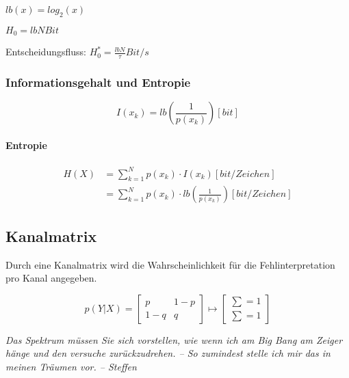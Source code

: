 \begin{multicols}{2}
	$lb(x) = log_2(x)$
	
	$H_0 = lbN Bit$
	
	Entscheidungsfluss: $H_0^* = \frac{lbN}{\tau} Bit/s$
	
	
	\subsubsection{Informationsgehalt und Entropie}
	
	\[
		I(x_k) = lb \left(\frac{1}{p(x_k)}\right) [bit]
	\]
	
	\paragraph{Entropie}
	
	\begin{align*}
		H(X) &= \sum_{k=1}^{N}{p(x_k) \cdot I(x_k)} [bit/Zeichen] \\
		&= \sum_{k=1}^{N}{p(x_k) \cdot lb \left(\frac{1}{p(x_k)}\right)} [bit/Zeichen]
	\end{align*}

	\subsection{Kanalmatrix}
	Durch eine Kanalmatrix wird die Wahrscheinlichkeit für die Fehlinterpretation pro Kanal angegeben.
	
	\[
		p(Y|X) = \begin{bmatrix}
			p & 1-p \\
			1-q & q
		\end{bmatrix}
		\mapsto  \begin{bmatrix}
			\sum = 1 \\
			\sum = 1
		\end{bmatrix}
	\]
	
	

\end{multicols}

	\emph{Das Spektrum müssen Sie sich vorstellen, wie wenn ich am Big Bang am Zeiger hänge und den versuche zurückzudrehen. \--- So zumindest stelle ich mir das in meinen Träumen vor. -- Steffen}



